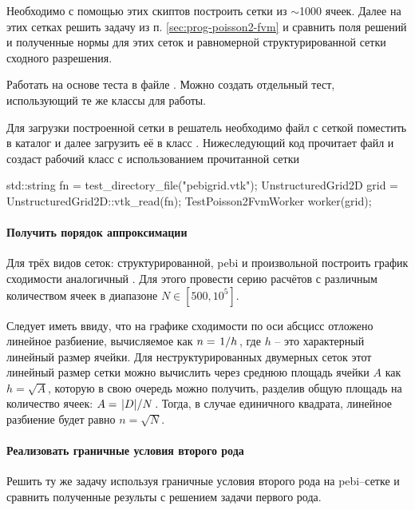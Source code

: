 Необходимо с помощью этих скиптов построить сетки
из $\sim$1000 ячеек. Далее на этих сетках
решить задачу из п. \ref{sec:prog-poisson2-fvm}
и сравнить поля решений и полученные нормы для этих сеток
и равномерной структурированной сетки сходного разрешения.

Работать на основе теста 
в файле .
Можно создать отдельный тест, использующий те же классы для работы.

Для загрузки построенной сетки в решатель необходимо файл
с сеткой поместить в каталог 
и далее загрузить её в класс .
Нижеследующий код прочитает файл 
и создаст рабочий класс с использованием прочитанной сетки
\begin{cppcode}
std::string fn = test_directory_file("pebigrid.vtk");
UnstructuredGrid2D grid = UnstructuredGrid2D::vtk_read(fn);
TestPoisson2FvmWorker worker(grid);
\end{cppcode}

\paragraph{Получить порядок аппроксимации}
Для трёх видов сеток: структурированной, pebi и
произвольной  построить график сходимости
аналогичный .
Для этого провести серию расчётов
с различным количеством ячеек в диапазоне $N\in[500, 10^5]$.

Следует иметь ввиду, что на графике сходимости
по оси абсцисс отложено линейное разбиение, вычисляемое как
$n=\left.1\middle/h\right.$, где $h$ -- это характерный линейный размер ячейки.
Для неструктурированных двумерных сеток этот линейный размер
сетки можно вычислить через среднюю площадь ячейки $A$ как $h = \sqrt{A}$,
которую в свою очередь можно получить, разделив общую площадь на количество
ячеек: $A = \left.|D|\middle/N\right.$.
Тогда, в случае единичного квадрата, линейное разбиение будет равно $n = \sqrt{N}$.

\paragraph{Реализовать граничные условия второго рода}
Решить ту же задачу используя граничные условия второго рода на pebi--сетке
и сравнить полученные результы с решением задачи первого рода.

